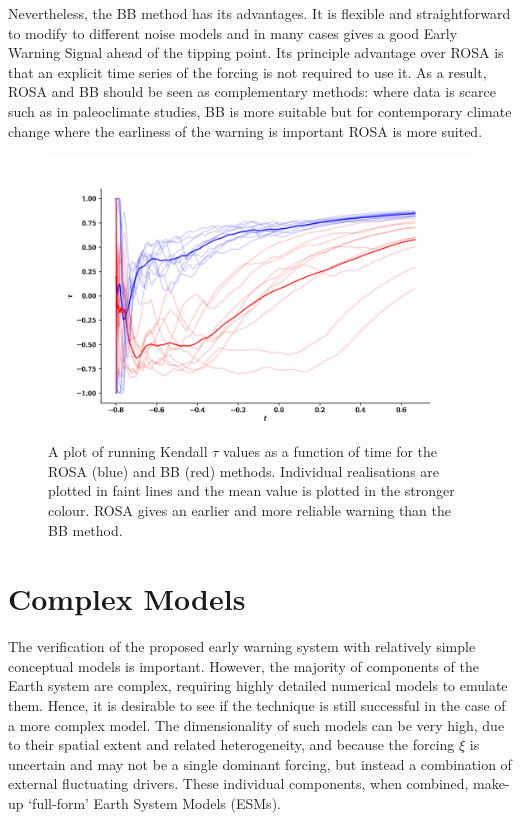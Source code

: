 Nevertheless, the BB method has its advantages.
It is flexible and straightforward to modify to different noise
models and in many cases gives a good Early Warning Signal 
ahead of the tipping point. Its principle advantage
over ROSA is that an explicit time series of the forcing is not required to use it. As a result, ROSA and BB should be seen as complementary methods: 
where data is scarce such as in paleoclimate studies, BB is more suitable but 
for contemporary climate change where the earliness of the warning is 
important ROSA is more suited.

\begin{figure}
\includegraphics[width=\textwidth,keepaspectratio]{figure3}
\caption[A comparison of ROSA and BB]{A plot of running Kendall $\tau$ values as a function of time for the ROSA (blue) and BB (red) methods.
  Individual realisations are plotted in faint lines and the mean value is plotted in the stronger colour. ROSA gives an earlier and more reliable warning than the BB 
method.}\label{fig:boers_method}
\end{figure}

\section{Complex Models}
\label{sec:complex_models}
The verification of the proposed early warning system with relatively simple conceptual models is important.
However, the majority of components of the Earth system are complex, requiring highly detailed numerical models to emulate them. Hence, it is 
desirable to see if the technique is still successful in the case of
a more complex model. The dimensionality of such models can be very high, due to their spatial extent and related heterogeneity, and 
because the forcing $\xi$ is uncertain and may not be a single dominant forcing,  but instead a combination of external fluctuating drivers.
These individual components, when combined, make-up `full-form' Earth System Models (ESMs).


